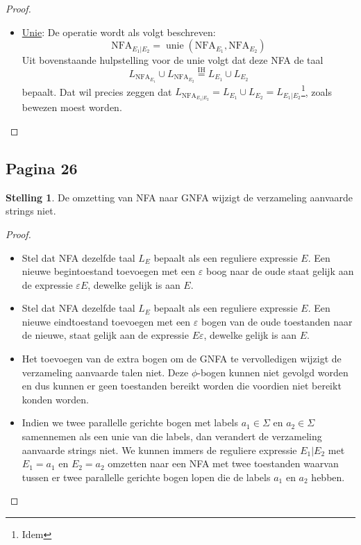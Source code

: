 \documentclass[kulak]{kulakarticle}
\newcommand{\NFA}{\text{NFA}}
\let\epsilon\varepsilon
\theoremstyle{definition}
\newtheorem*{stelling}{Stelling}
\begin{document}
\begin{proof}
\begin{itemize}
\begin{itemize}
				\item \underline{Unie}: De operatie wordt als volgt beschreven: \[ \NFA_{E_1|E_2}=\operatorname*{unie}(\NFA_{E_1},\NFA_{E_2}) \] Uit bovenstaande hulpstelling voor de unie volgt dat deze NFA de taal \[L_{\NFA_{E_1}}\cup L_{\NFA_{E_2}} \overset{\text{IH}}{=} L_{E_1} \cup L_{E_2}\] bepaalt. Dat wil precies zeggen dat \(L_{\NFA_{E_1|E_2}}=L_{E_1} \cup L_{E_2}=L_{E_1 | E_2}\)\footnote{Idem}, zoals bewezen moest worden.
			\end{itemize}
		\end{itemize}

	\end{proof}

	\subsection*{Pagina 26}

	\begin{stelling}
		De omzetting van NFA naar GNFA wijzigt de verzameling aanvaarde strings niet.
	\end{stelling}

	\begin{proof}
		\hfill
		\begin{itemize}
			\item Stel dat NFA dezelfde taal $L_E$ bepaalt als een reguliere expressie $E$. Een nieuwe begintoestand toevoegen met een $\epsilon$ boog naar de oude staat gelijk aan de expressie $\epsilon E$, dewelke gelijk is aan $E$.
			\item Stel dat NFA dezelfde taal $L_E$ bepaalt als een reguliere expressie $E$. Een nieuwe eindtoestand toevoegen met een $\epsilon$ bogen van de oude toestanden naar de nieuwe, staat gelijk aan de expressie $E\epsilon$, dewelke gelijk is aan $E$.
			\item Het toevoegen van de extra bogen om de GNFA te vervolledigen wijzigt de verzameling aanvaarde talen niet. Deze $\phi$-bogen kunnen niet gevolgd worden en dus kunnen er geen toestanden bereikt worden die voordien niet bereikt konden worden.
			\item Indien we twee parallelle gerichte bogen met labels $a_1 \in \Sigma$ en $a_2 \in \Sigma$ samennemen als een unie van die labels, dan verandert de verzameling aanvaarde strings niet. We kunnen immers de reguliere expressie $E_1|E_2$ met $E_1 = a_1$ en $E_2 = a_2$ omzetten naar een NFA met twee toestanden waarvan tussen er twee parallelle gerichte bogen lopen die de labels $a_1$ en $a_2$ hebben.
		\end{itemize}
	\end{proof}
\end{document}
